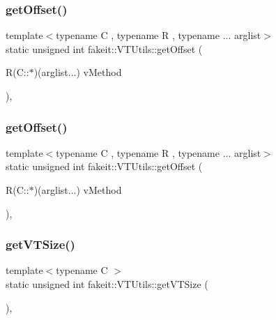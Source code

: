 \mbox{\label{classfakeit_1_1VTUtils_a0e019646d770355889228b1d88675530}} 
\subsubsection{\texorpdfstring{getOffset()}{getOffset()}\hspace{0.1cm}{\footnotesize\ttfamily [8/9]}}
{\footnotesize\ttfamily template$<$typename C , typename R , typename ... arglist$>$ \\
static unsigned int fakeit\+::\+V\+T\+Utils\+::get\+Offset (\begin{DoxyParamCaption}\item[{R(C\+::$\ast$)(arglist...)}]{v\+Method }\end{DoxyParamCaption})\hspace{0.3cm}{\ttfamily [inline]}, {\ttfamily [static]}}

\mbox{\label{classfakeit_1_1VTUtils_a0e019646d770355889228b1d88675530}} 
\subsubsection{\texorpdfstring{getOffset()}{getOffset()}\hspace{0.1cm}{\footnotesize\ttfamily [9/9]}}
{\footnotesize\ttfamily template$<$typename C , typename R , typename ... arglist$>$ \\
static unsigned int fakeit\+::\+V\+T\+Utils\+::get\+Offset (\begin{DoxyParamCaption}\item[{R(C\+::$\ast$)(arglist...)}]{v\+Method }\end{DoxyParamCaption})\hspace{0.3cm}{\ttfamily [inline]}, {\ttfamily [static]}}

\mbox{\label{classfakeit_1_1VTUtils_a54ddc7bb539671fbf957920f051a6104}} 
\subsubsection{\texorpdfstring{getVTSize()}{getVTSize()}\hspace{0.1cm}{\footnotesize\ttfamily [1/9]}}
{\footnotesize\ttfamily template$<$typename C $>$ \\
static unsigned int fakeit\+::\+V\+T\+Utils\+::get\+V\+T\+Size (\begin{DoxyParamCaption}{ }\end{DoxyParamCaption})\hspace{0.3cm}{\ttfamily [inline]}, {\ttfamily [static]}}

